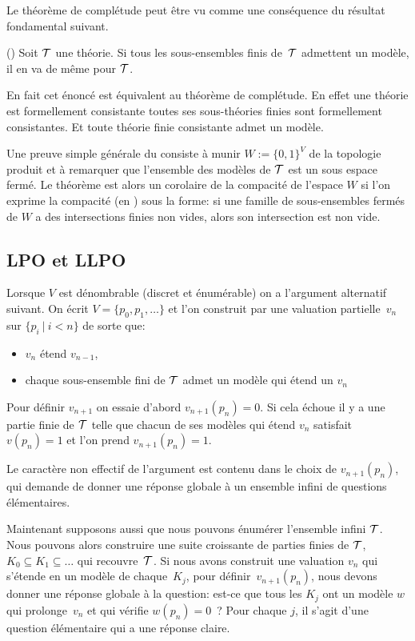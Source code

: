 Le théorème de complétude peut être vu comme une conséquence du résultat fondamental suivant. 

\begin{theorem}
(\tcg) Soit ${\cal T}$ une théorie.
Si tous les sous-ensembles finis de~${\cal T}$ admettent un modèle, il en va de même pour ${\cal T}$.
\end{theorem}

En fait cet énoncé est équivalent au théorème de complétude. En effet une théorie est formellement consistante \ssi toutes ses sous-théories finies sont formellement consistantes. Et toute théorie finie consistante admet un modèle.

Une preuve simple générale du \tcg consiste à munir $W:=\{0,1\}^V$ de la topologie produit et à remarquer que l'ensemble des modèles de ${\cal T}$ est un sous espace fermé. Le théorème est alors un corolaire de la compacité de l'espace $W$ si l'on exprime la compacité (en \clama) sous la forme: si une famille de sous-ensembles fermés de $W$ a des intersections finies non vides, alors son intersection est non vide. 

\subsection{LPO et LLPO}

Lorsque $V$ est dénombrable (\cad discret et énumérable) on a l'argument alternatif suivant. On écrit $V = \{p_0,p_1,\dots \}$ et l'on construit par \recu une valuation partielle~$v_n$ sur $\{p_i~|~i<n\}$ de sorte que: 
\begin{itemize}
%
\item $v_n$ étend $v_{n-1}$,
%
\item chaque sous-ensemble fini de ${\cal T}$ admet un modèle qui étend un $v_n$ 
%
\end{itemize}
Pour définir $v_{n+1}$ on essaie d'abord $v_{n+1}(p_n) = 0$.
Si cela échoue il y a une partie finie de ${\cal T}$ telle que chacun de ses modèles qui étend $v_n$ satisfait $v(p_n) = 1$ et l'on prend $v_{n+1}(p_n) = 1$.

Le caractère non effectif de l'argument est contenu dans le choix de $v_{n+1}(p_n)$, qui demande de donner une réponse globale à un ensemble infini de questions élémentaires.

Maintenant supposons aussi que nous pouvons énumérer l'ensemble infini ${\cal T}$.
Nous pouvons alors construire une suite croissante de parties finies de ${\cal T}$,
$K_0\subseteq K_1\subseteq \dots$ qui recouvre~${\cal T}$.
Si nous avons construit une valuation $v_n$ qui s'étende en un modèle de chaque~$K_j$, pour définir~$v_{n+1}(p_n)$, nous devons donner une réponse globale à la question: est-ce que tous les $K_j$ ont un modèle $w$ qui prolonge~$v_{n}$ et qui vérifie $w(p_n)=0$~?  
Pour chaque $j$, il s'agit d'une question élémentaire qui a une réponse claire. 

